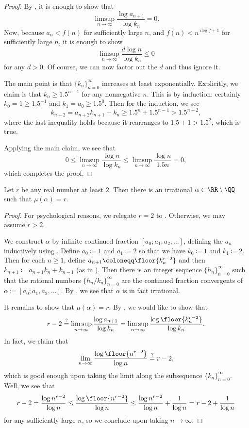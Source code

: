 \documentclass[../notes.tex]{subfiles}
\begin{document}
\begin{proof}
	By , it is enough to show that
	\[\limsup_{n\to\infty}\frac{\log a_{n+1}}{\log k_n}=0.\]
	Now, because $a_n<f(n)$ for sufficiently large $n$, and $f(n)<n^{\deg f+1}$ for sufficiently large $n$, it is enough to show
	\[\limsup_{n\to\infty}\frac{d\log n}{\log k_n}\le0\]
	for any $d>0$. Of course, we can now factor out the $d$ and thus ignore it.

	The main point is that $\{k_n\}_{n=0}^\infty$ increases at least exponentially. Explicitly, we claim is that $k_n\ge 1.5^{n-1}$ for any nonnegative $n$. This is by induction: certainly $k_0=1\ge1.5^{-1}$ and $k_1=a_0\ge1.5^0$. Then for the induction, we see
	\[k_{n+2}=a_{n+2}k_{n+1}+k_n\ge1.5^n+1.5^{n-1}>1.5^{n-2},\]
	where the last inequality holds because it rearranges to $1.5+1>1.5^2$, which is true.
	
	Applying the main claim, we see that
	\[0\le\limsup_{n\to\infty}\frac{\log n}{\log k_n}\le\limsup_{n\to\infty}\frac{\log n}{1.5n}=0,\]
	which completes the proof.
\end{proof}
\begin{corollary} \label{cor:construct-mu}
	Let $r$ be any real number at least $2$. Then there is an irrational $\alpha\in\RR\setminus\QQ$ such that $\mu(\alpha)=r$.
\end{corollary}
\begin{proof}
	For psychological reasons, we relegate $r=2$ to . Otherwise, we may assume $r>2$.

	We construct $\alpha$ by infinite continued fraction $[a_0;a_1,a_2,\ldots]$, defining the $a_n$ inductively using . Define $a_0\coloneqq1$ and $a_1\coloneqq2$ so that we have $k_0\coloneqq1$ and $k_1\coloneqq2$. Then for each $n\ge1$, define $a_{n+1}\coloneqq\floor{k_n^{r-2}}$ and then $k_{n+1}\coloneqq a_{n+1}k_n+k_{n-1}$ (as in ). Then there is an integer sequence $\{h_n\}_{n=0}^\infty$ such that the rational numbers $\{h_n/k_n\}_{n=0}^\infty$ are the continued fraction convergents of $\alpha\coloneqq[a_0;a_1,a_2,\ldots]$. By , we see that $\alpha$ is in fact irrational.

	It remains to show that $\mu(\alpha)=r$. By , we would like to show that
	\[r-2\stackrel?=\limsup_{n\to\infty}\frac{\log a_{n+1}}{\log k_n}=\limsup_{n\to\infty}\frac{\log\floor{k_n^{r-2}}}{\log k_n}.\]
	In fact, we claim that
	\[\lim_{n\to\infty}\frac{\log\floor{n^{r-2}}}{\log n}\stackrel?=r-2,\]
	which is good enough upon taking the limit along the subsequence $\{k_n\}_{n=0}^\infty$. Well, we see that
	\[r-2=\frac{\log n^{r-2}}{\log n}\le\frac{\log\floor{n^{r-2}}}{\log n}\le\frac{\log n^{r-2}}{\log n}+\frac1{\log n}=r-2+\frac1{\log n}\]
	for any sufficiently large $n$, so we conclude upon taking $n\to\infty$.
\end{proof}
\end{document}
